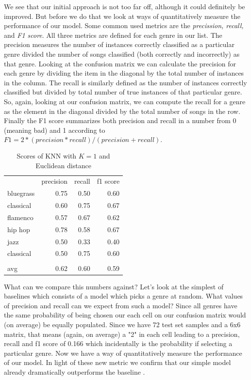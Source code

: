 \documentclass[12pt]{article}
\begin{document}
We see that our initial approach is not too far off, although it could definitely be improved. But before we do that we look at ways of quantitatively  measure the performance of our model. Some common used metrics are the \textit{precission, recall,} and \textit{F1 score}. All three metrics are defined for each genre in our list. The precision measures the number of instances correctly classified as a particular genre divided the number of songs classified (both correctly and incorrectly) as that genre. Looking at the confusion matrix  we can calculate the precision for each genre by dividing the item in the diagonal by the total number of instances in the column. The recall is similarly defined as the number of instances correctly classified but divided by total number of true instances of that particular genre. So, again, looking at our confusion matrix, we can compute the recall for a genre as the element in the diagonal divided by the total number of songs in the row. Finally the F1 score summarizes both precision and recall in a number from 0 (meaning bad) and 1 according to $F1 = 2*(precision*recall)/(precision+recall)$.

\begin{table}[]
\centering
\begin{tabular}{lrrr}
          & precision & recall & f1 score \\
bluegrass & 0.75      & 0.50   & 0.60     \\
classical & 0.60      & 0.75   & 0.67     \\
flamenco  & 0.57      & 0.67   & 0.62     \\
hip hop   & 0.78      & 0.58   & 0.67     \\
jazz      & 0.50      & 0.33   & 0.40     \\
classical & 0.50      & 0.75   & 0.60     \\
          &           &        &          \\
avg       & 0.62      & 0.60   & 0.59    
\end{tabular}
\caption{Scores of KNN with $K=1$ and Euclidean distance}
\label{naiveKNN_t}
\end{table}
\medskip

What can we compare this numbers against? Let's look at the simplest of baselines which consists of a model which picks a genre at random. What values of precision and recall can we expect from such a model? Since all genres have the same probability of being chosen our each cell on our confusion matrix would (on average) be equally populated. Since we have 72 test set samples and a 6x6 matrix, that means (again, on average) a "2" in each cell leading to a precision, recall and f1 score of 0.166 which incidentally is the probability if selecting a particular genre. Now we have a way of quantitatively measure the performance of our model. In light of these new metric we confirm that our simple model already dramatically outperforms the baseline .
\medskip
\end{document}
